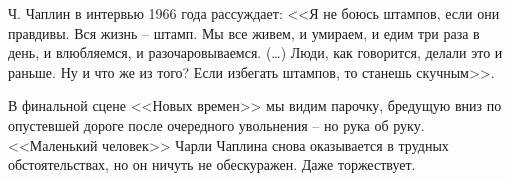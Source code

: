 Ч. Чаплин в интервью 1966 года рассуждает: <<Я не боюсь штампов, если они правдивы. Вся жизнь –
штамп. Мы все живем, и умираем, и едим три раза в день,  и влюбляемся, и разочаровываемся. (\ldots)
Люди, как говорится, делали это и раньше. Ну и что же из того? Если избегать штампов, то станешь
скучным>>. \autocite[][138]{chaplin2005}

В финальной сцене <<Новых времен>> мы видим парочку, бредущую вниз по опустевшей дороге после
очередного увольнения -- но рука об руку. <<Маленький человек>>  Чарли Чаплина снова оказывается в
трудных обстоятельствах, но он ничуть не обескуражен. Даже торжествует.
